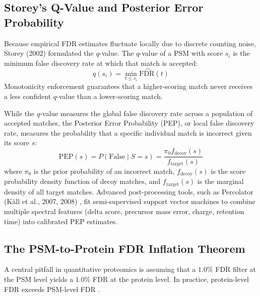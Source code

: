 \documentclass[11pt,twoside,openright]{book}
\begin{document}
\subsection{Storey's Q-Value and Posterior Error Probability}
Because empirical FDR estimates fluctuate locally due to discrete counting noise, Storey (2002) \cite{storey2002direct} formulated the $q$-value. The $q$-value of a PSM with score $s_i$ is the minimum false discovery rate at which that match is accepted:
\begin{equation}
q(s_i) = \min_{t \le s_i} \widehat{\text{FDR}}(t)
\label{eq:q_value}
\end{equation}
Monotonicity enforcement guarantees that a higher-scoring match never receives a less confident $q$-value than a lower-scoring match.

While the $q$-value measures the global false discovery rate across a population of accepted matches, the Posterior Error Probability (PEP), or local false discovery rate, measures the probability that a specific individual match is incorrect given its score $s$:
\begin{equation}
\text{PEP}(s) = P(\text{False} \mid S = s) = \frac{\pi_0 f_{\text{decoy}}(s)}{f_{\text{target}}(s)}
\label{eq:pep_formula}
\end{equation}
where $\pi_0$ is the prior probability of an incorrect match, $f_{\text{decoy}}(s)$ is the score probability density function of decoy matches, and $f_{\text{target}}(s)$ is the marginal density of all target matches. Advanced post-processing tools, such as Percolator (K\"all et al., 2007, 2008) \cite{kall2007semi, kall2008posterior}, fit semi-supervised support vector machines to combine multiple spectral features (delta score, precursor mass error, charge, retention time) into calibrated PEP estimates.

\subsection{The PSM-to-Protein FDR Inflation Theorem}
A central pitfall in quantitative proteomics is assuming that a $1.0\%$ FDR filter at the PSM level yields a $1.0\%$ FDR at the protein level. In practice, protein-level FDR exceeds PSM-level FDR \cite{nesvizhskii2005interpretation, savitski2015measuring, gupta2009false}.
\end{document}

